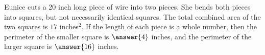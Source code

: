 \documentclass{ximera}
\author{Kenneth Berglund}
\begin{document}
\begin{exercise}
Eunice cuts a 20 inch long piece of wire into two pieces. She bends both pieces into squares, but not necessarily identical squares. The total combined area of the two squares is $17$ inches$^2$. If the length of each piece is a whole number, then the perimeter of the smaller square is $\answer{4}$ inches, and the perimeter of the larger square is $\answer{16}$ inches.


\end{exercise}
\end{document}
